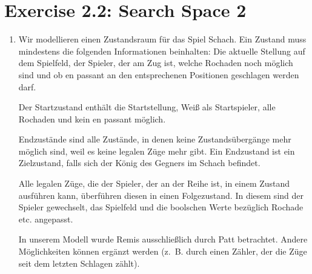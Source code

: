 \documentclass[a4paper]{scrartcl}
\def \blattnr {2}
\begin{document}
\section*{Exercise \blattnr.2: Search Space 2}
\begin{enumerate}
	\item 
        Wir modellieren einen Zustandsraum für das Spiel Schach.
        Ein Zustand muss mindestens die folgenden Informationen beinhalten: Die
        aktuelle Stellung auf dem Spielfeld, der Spieler, der am Zug ist,
        welche Rochaden noch möglich sind und ob en passant an den
        entsprechenen Positionen geschlagen werden darf.

        Der Startzustand enthält die Startstellung, Weiß als Startspieler,
        alle Rochaden und kein en passant möglich.

        Endzustände sind alle Zustände, in denen keine Zustandsübergänge mehr
        möglich sind, weil es keine legalen Züge mehr gibt. Ein Endzustand ist
        ein Zielzustand, falls sich der König des Gegners im Schach befindet.

        Alle legalen Züge, die der Spieler, der an der Reihe ist, in einem
        Zustand ausführen kann, überführen diesen in einen Folgezustand. In
        diesem sind der Spieler gewechselt, das Spielfeld und die boolschen
        Werte bezüglich Rochade etc. angepasst.

        In unserem Modell wurde Remis ausschließlich durch Patt betrachtet.
        Andere Möglichkeiten können ergänzt werden (z.~B. durch einen Zähler,
        der die Züge seit dem letzten Schlagen zählt).

	
\end{enumerate}
\end{document}
